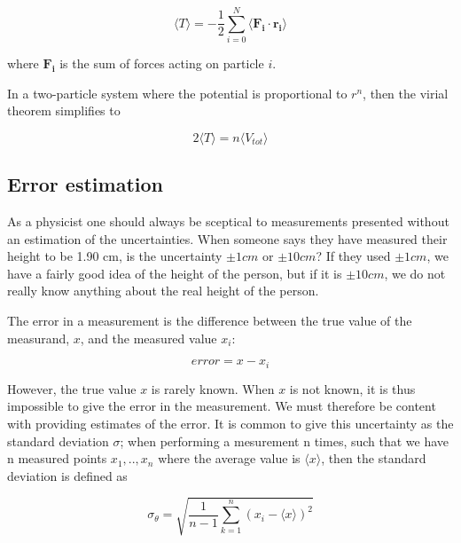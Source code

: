 \documentclass[norsk,a4paper,12pt]{article}
\begin{document}
\begin{equation}
\langle T \rangle = - \frac{1}{2} \sum_{i=0}^N \langle \boldsymbol{F_i} \cdot \boldsymbol{r_i} \rangle 
\end{equation}

where $\boldsymbol{F_i}$ is the sum of forces acting on particle $i$.\par 
\vspace{3mm}

In a two-particle system where the potential is proportional to $r^n$, then the virial theorem simplifies to 

\begin{equation}
\label{eq:virial_simple}
2 \langle T \rangle = n \langle V_{tot} \rangle
\end{equation}

\subsection{Error estimation} \label{sec:error_estimation}
As a physicist one should always be sceptical to measurements presented without an estimation of the uncertainties. When someone says they have measured their height to be 1.90 cm, is the uncertainty $\pm 1 cm$ or $\pm 10 cm$? If they used $\pm 1 cm$, we have a fairly good idea of the height of the person, but if it is $\pm 10 cm$, we do not really know anything about the real height of the person. 
\par 
\vspace{3mm}
The error in a measurement is the difference between the true value of the measurand, $x$, and the measured value $x_i$:

\begin{equation}
	error = x - x_i
\end{equation}

However, the true value $x$ is rarely known. When $x$ is not known, it is thus impossible to give the error in the measurement. We must therefore be content with providing estimates of the error. It is common to give this uncertainty as the standard deviation $\sigma$; when performing a mesurement n times, such that we have n measured points $x_1, .., x_n$ where the average value is $ \langle x \rangle $, then the standard deviation is defined as

\begin{equation}
\label{eq:standard_dev}
\sigma_{\theta} =  \sqrt{\frac{1}{n-1} \sum_{k=1}^n (x_i - \langle x \rangle)^2}
\end{equation}
\end{document}
